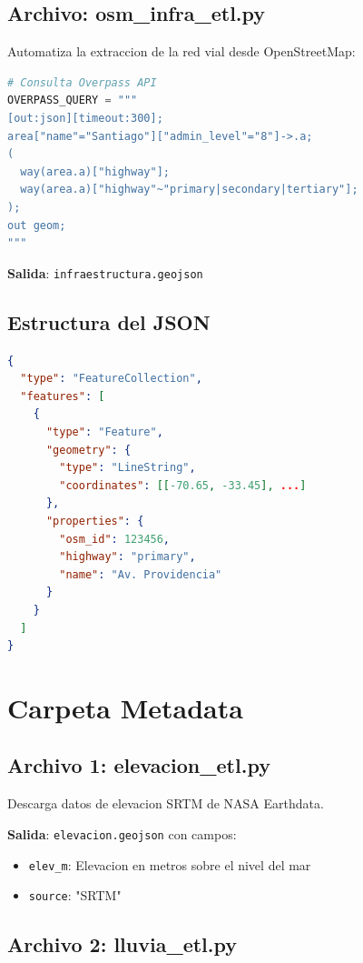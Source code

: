 \documentclass[12pt,a4paper]{article}
\begin{document}
\subsection{Archivo: osm\_infra\_etl.py}

Automatiza la extraccion de la red vial desde OpenStreetMap:

\begin{lstlisting}[language=Python]
# Consulta Overpass API
OVERPASS_QUERY = """
[out:json][timeout:300];
area["name"="Santiago"]["admin_level"="8"]->.a;
(
  way(area.a)["highway"];
  way(area.a)["highway"~"primary|secondary|tertiary"];
);
out geom;
"""
\end{lstlisting}

\textbf{Salida}: \texttt{infraestructura.geojson}

\subsection{Estructura del JSON}

\begin{lstlisting}[language=json]
{
  "type": "FeatureCollection",
  "features": [
    {
      "type": "Feature",
      "geometry": {
        "type": "LineString",
        "coordinates": [[-70.65, -33.45], ...]
      },
      "properties": {
        "osm_id": 123456,
        "highway": "primary",
        "name": "Av. Providencia"
      }
    }
  ]
}
\end{lstlisting}

\section{Carpeta Metadata}

\subsection{Archivo 1: elevacion\_etl.py}

Descarga datos de elevacion SRTM de NASA Earthdata.

\textbf{Salida}: \texttt{elevacion.geojson} con campos:
\begin{itemize}
    \item \texttt{elev\_m}: Elevacion en metros sobre el nivel del mar
    \item \texttt{source}: "SRTM"
\end{itemize}

\subsection{Archivo 2: lluvia\_etl.py}
\end{document}
